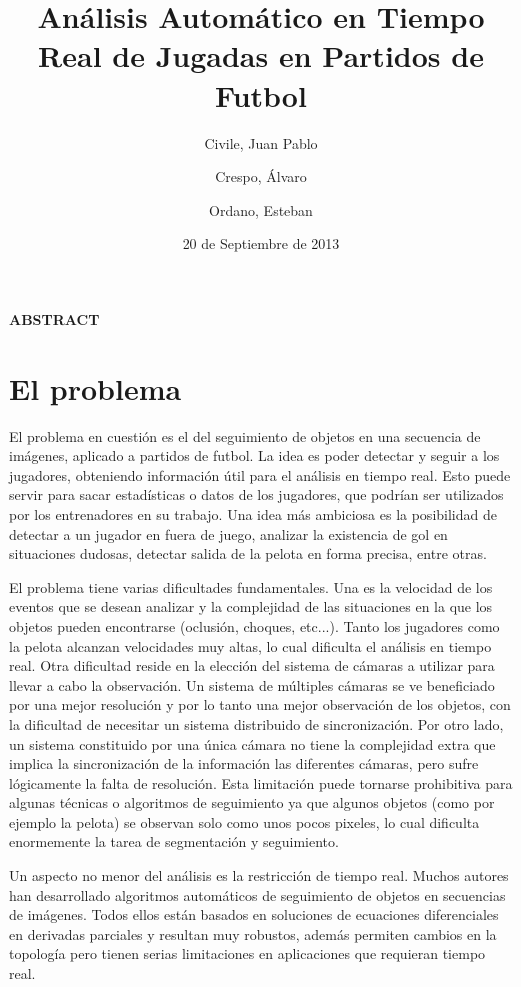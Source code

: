 \documentclass[a4paper,10pt]{article}
\title{Análisis Automático en Tiempo Real de Jugadas en Partidos de Futbol}
\date{20 de Septiembre de 2013}
\author{Civile, Juan Pablo \and Crespo, Álvaro \and Ordano, Esteban }
\begin{document}
\pagestyle{fancy}
\maketitle
\thispagestyle{fancy}


\begin{customabstract}
\textbf{
ABSTRACT
} \end{customabstract}

\part*{El problema}

El problema en cuestión es el del seguimiento de objetos en una secuencia de imágenes, aplicado a partidos de futbol.
La idea es poder detectar y seguir a los jugadores, obteniendo información útil para el análisis en tiempo real.
Esto puede servir para sacar estadísticas o datos de los jugadores, que podrían ser utilizados por los entrenadores en su trabajo.
Una idea más ambiciosa es la posibilidad de detectar a un jugador en fuera de juego, analizar la existencia de gol en situaciones
dudosas, detectar salida de la pelota en forma precisa, entre otras.

El problema tiene varias dificultades fundamentales. Una es la velocidad de los eventos que se desean analizar y la complejidad
de las situaciones en la que los objetos pueden encontrarse (oclusión, choques, etc...). Tanto
los jugadores como la pelota alcanzan velocidades muy altas, lo cual dificulta el análisis en tiempo real. Otra dificultad
reside en la elección del sistema de cámaras a utilizar para llevar a cabo la observación. Un sistema de múltiples cámaras se
ve beneficiado por una mejor resolución y por lo tanto una mejor observación de los objetos, con la dificultad de necesitar un
sistema distribuido de sincronización. Por otro lado, un sistema constituido por una única cámara no tiene la complejidad extra
que implica la sincronización de la información las diferentes cámaras, pero sufre lógicamente la falta de resolución. Esta
limitación puede tornarse prohibitiva para algunas técnicas o algoritmos de seguimiento ya que algunos objetos (como por ejemplo
la pelota) se observan solo como unos pocos pixeles, lo cual dificulta enormemente la tarea de segmentación y seguimiento.

Un aspecto no menor del análisis es la restricción de tiempo real. Muchos autores han desarrollado algoritmos automáticos
de seguimiento de objetos en secuencias de imágenes. Todos ellos están basados en soluciones de ecuaciones diferenciales
en derivadas parciales y resultan muy robustos, además permiten cambios en la topología pero tienen serias limitaciones
en aplicaciones que requieran tiempo real.
\end{document}
